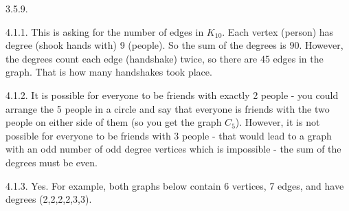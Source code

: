 \begin {itemize}
\begin{ans}{3.5.9.}
	
\end{ans}
\protect \end {itemize}
 \protect {} \protect \begin {itemize} 
\begin{ans}{4.1.1.}
		This is asking for the number of edges in $K_{10}$.  Each vertex (person) has degree (shook hands with) 9 (people).  So the sum of the degrees is $90$.  However, the degrees count each edge (handshake) twice, so there are 45 edges in the graph.  That is how many handshakes took place.%
	
\end{ans}
\begin{ans}{4.1.2.}
		It is possible for everyone to be friends with exactly 2 people - you could arrange the 5 people in a circle and say that everyone is friends with the two people on either side of them (so you get the graph $C_5$).  However, it is not possible for everyone to be friends with 3 people - that would lead to a graph with an odd number of odd degree vertices which is impossible - the sum of the degrees must be even.  %
	
\end{ans}
\begin{ans}{4.1.3.}
		Yes.  For example, both graphs below contain 6 vertices, 7 edges, and have degrees (2,2,2,2,3,3).
		\begin{center}
		  \hfill
		  \hfill
		  \hfill ~
		\end{center}
	

\end{ans}
\end{itemize}
